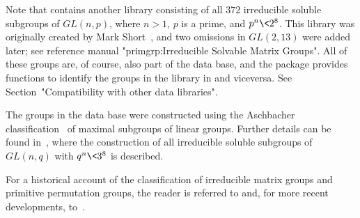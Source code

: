 Note that {\GAP} contains another library consisting of all $372$ irreducible soluble
subgroups of $GL(n, p)$, where $n > 1$, $p$ is a prime, and $p^n \< 2^8$. This library 
was originally
created by Mark Short~\cite{Sho}, and two omissions in $GL(2,13)$ were added later; 
see {\PrimGrp} reference manual "primgrp:Irreducible Solvable Matrix Groups".
All of these groups are,  of course, also part of the {\IRREDSOL} data base, and the
{\IRREDSOL} package provides functions to identify the groups in the
{\GAP} library in {\IRREDSOL} and viceversa. See
Section~"Compatibility with other data libraries".

The groups in the {\IRREDSOL} data base were constructed using the Aschbacher 
classification~\cite{Asc} of maximal subgroups of linear groups. Further details can be found 
in~\cite{EH}, where the 
construction of all irreducible soluble subgroups of $GL(n, q)$ with $q^n \< 3^8$
is described.

For a historical account of the classification of irreducible matrix groups and
primitive permutation groups, the reader is referred to \cite{Sho} and, 
for more recent developments, to~\cite{EH}.


